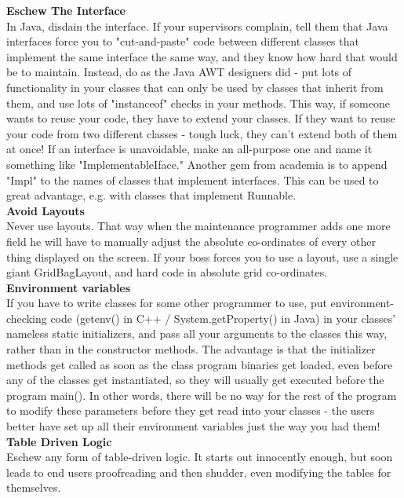 \documentclass[11pt,twoside,a4paper]{article}
\begin{document}
\textbf{Eschew The Interface}~\\
In Java, disdain the interface. If your supervisors complain, tell them that Java interfaces force you to "cut-and-paste" code between different classes that implement the same interface the same way, and they know how hard that would be to maintain. Instead, do as the Java AWT designers did - put lots of functionality in your classes that can only be used by classes that inherit from them, and use lots of "instanceof" checks in your methods. This way, if someone wants to reuse your code, they have to extend your classes. If they want to reuse your code from two different classes - tough luck, they can't extend both of them at once! If an interface is unavoidable, make an all-purpose one and name it something like "ImplementableIface." Another gem from academia is to append "Impl" to the names of classes that implement interfaces. This can be used to great advantage, e.g. with classes that implement Runnable.~\\ 

\textbf{Avoid Layouts}~\\
Never use layouts. That way when the maintenance programmer adds one more field he will have to manually adjust the absolute co-ordinates of every other thing displayed on the screen. If your boss forces you to use a layout, use a single giant GridBagLayout, and hard code in absolute grid co-ordinates.~\\ 

\textbf{Environment variables}~\\
If you have to write classes for some other programmer to use, put environment-checking code (getenv() in C++ / System.getProperty() in Java) in your classes' nameless static initializers, and pass all your arguments to the classes this way, rather than in the constructor methods. The advantage is that the initializer methods get called as soon as the class program binaries get loaded, even before any of the classes get instantiated, so they will usually get executed before the program main(). In other words, there will be no way for the rest of the program to modify these parameters before they get read into your classes - the users better have set up all their environment variables just the way you had them!~\\ 

\textbf{Table Driven Logic}~\\
Eschew any form of table-driven logic. It starts out innocently enough, but soon leads to end users proofreading and then shudder, even modifying the tables for themselves.~\\ 
\end{document}
